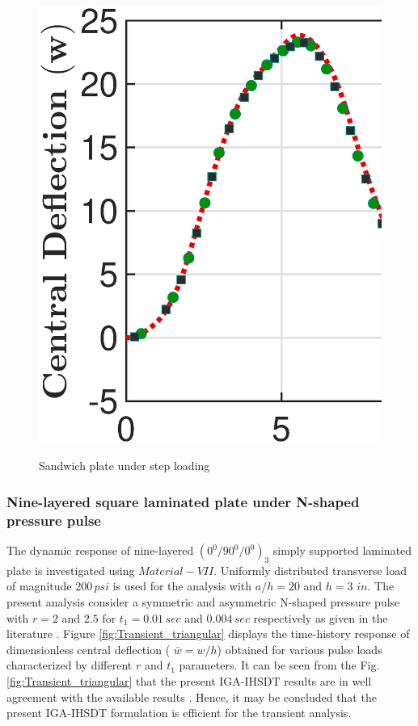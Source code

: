 \documentclass[3p,preprint,12pt]{elsarticle}
\begin{document}
\begin{figure}
\begin{minipage}{\textwidth}
		{\includegraphics[scale=0.3]{Step_UDL_Sandwich_IGA_NPSDT_Transient_h_By_a_1_10.eps}}
	\end{minipage}
	\caption{Sandwich plate under step loading}
	\label{fig:Transient_Sandwich}
\end{figure}

\subsubsection{Nine-layered square laminated plate under N-shaped pressure pulse}
The dynamic response of nine-layered $(0^0/90^0/0^0)_3$ simply supported laminated plate is investigated using $Material-VII$. Uniformly distributed transverse load of magnitude $200\,psi$ is used for the analysis with $a/h=20$ and $h=3 \,\,in$. The present analysis consider a symmetric and asymmetric N-shaped pressure pulse with $r=2$ and $2.5$ for $t_{1}=0.01\,sec$ and $0.004\,sec$ respectively as given in the literature \cite{nosier1990effects}. Figure \ref{fig:Transient_triangular} displays the time-history response of dimensionless central deflection ( $\bar{w}=w/h$) obtained for various pulse loads characterized by different $r$ and $t_1$ parameters. It can be seen from the Fig. \ref{fig:Transient_triangular} that the present IGA-IHSDT results are in well agreement with the available results \cite{nosier1990effects}. Hence, it may be concluded that the present IGA-IHSDT formulation is efficient for the transient analysis.
\end{document}

